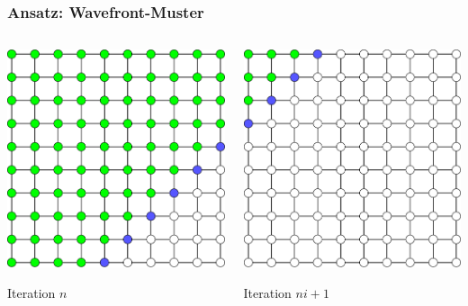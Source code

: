 \documentclass{beamer}
\begin{document}
\begin{frame}
    \frametitle{Ansatz: Wavefront-Muster}
    \begin{columns}
        \begin{column}{0.5\textwidth}
            \includegraphics[width=\textwidth]{wavefront1}
                        
            \centering Iteration \(n\)
        \end{column}
        \begin{column}{0.5\textwidth}
            \includegraphics[width=\textwidth]{wavefront2}
            
            \centering Iteration \(ni + 1\)
        \end{column}
    \end{columns}
\end{frame}
\end{document}
